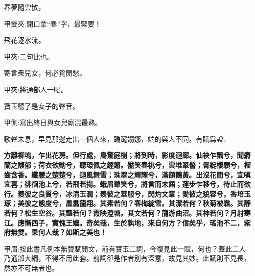\begin{poem}
    \begin{pl}春夢隨雲散，\end{pl}
    \begin{note}甲雙夾:開口拿“春”字，最緊要！\end{note}

    \begin{pl}飛花逐水流。\end{pl}\begin{note}甲夾:二句比也。\end{note}

    \begin{pl}寄言衆兒女，何必覓閒愁。\end{pl}
    \begin{note}甲夾:將通部人一喝。\end{note}
\end{poem}


\begin{parag}
    寶玉聽了是女子的聲音。\begin{note}甲側:寫出終日與女兒廝混最熟。\end{note}歌聲未息，早見那邊走出一個人來，蹁躚嫋娜，端的與人不同。有賦爲證:
\end{parag}


\begin{qute2sp}
    \textbf{
        方離柳塢，乍出花房。但行處，鳥驚庭樹；將到時，影度迴廊。仙袂乍飄兮，聞麝蘭之馥郁；荷衣欲動兮，聽環佩之鏗鏘。靨笑春桃兮，雲堆翠髻；脣綻櫻顆兮，榴齒含香。纖腰之楚楚兮，迴風舞雪；珠翠之輝輝兮，滿額鵝黃。出沒花間兮，宜嗔宜喜；徘徊池上兮，若飛若揚。蛾眉顰笑兮，將言而未語；蓮步乍移兮，待止而欲行。羨彼之良質兮，冰清玉潤；羨彼之華服兮，閃灼文章；愛彼之貌容兮，香培玉琢；美彼之態度兮，鳳翥龍翔。其素若何？春梅綻雪。其潔若何？秋菊被霜。其靜若何？松生空谷。其豔若何？霞映澄塘。其文若何？龍游曲沼。其神若何？月射寒江。應慚西子，實愧王嬙。奇矣哉，生於孰地，來自何方？信矣乎，瑤池不二，紫府無雙。果何人哉？如斯之美也！}
    \begin{note}甲眉:按此書凡例本無贊賦閒文，前有寶玉二詞，今復見此一賦，何也？蓋此二人乃通部大綱，不得不用此套。前詞卻是作者別有深意，故見其妙。此賦則不見長，然亦不可無者也。\end{note}

\end{qute2sp}


